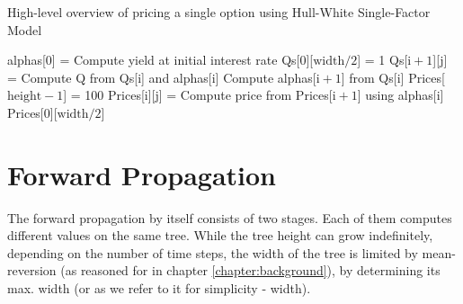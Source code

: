 \newpage
\begin{algorithm}[H]
\DontPrintSemicolon
\caption{High-level overview of pricing a single option using Hull-White Single-Factor Model\label{alg:loops}}

\;
alphas[0] = Compute yield at initial interest rate\;
Qs[0][$\text{width}/2$] = 1
\;
 {
     {
        Qs[$\text{i} + 1$][j] = Compute Q from Qs[i] and alphas[i]\;
    }
    Compute alphas[$\text{i} + 1$] from Qs[i]\;
}
\;
Prices[$\text{height} - 1$] = 100\;
\;
 {
     {
        Prices[i][j] = Compute price from Prices[$\text{i}+1$] using alphas[i]\;
    }
}
\;
\Return Prices[0][$\text{width}/2$]\;
\end{algorithm}

\section{Forward Propagation}
\label{section:hullwhite:forwardpropagation}
The forward propagation by itself consists of two stages. Each of them computes different values on the same tree. While the tree height can grow indefinitely, depending on the number of time steps, the width of the tree is limited by mean-reversion (as reasoned for in chapter \ref{chapter:background}), by determining its max. width (or as we refer to it for simplicity - width). 

